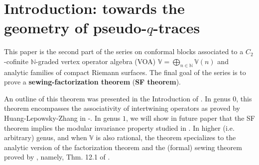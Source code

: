 \documentclass[11pt,b5paper,notitlepage]{article}
\theoremstyle{definition}
\theoremstyle{plain}
\newcommand{\Vbb}{\mathbb V}
\newcommand{\Nbb}{\mathbb N}
\newcommand{\<}{\left\langle}
\renewcommand{\>}{\right\rangle}
\numberwithin{equation}{subsection}
\begin{document}


	
	
	
	

	
	

	
	
	
	
	
	
	
	
	



\section{Introduction: towards the geometry of pseudo-$q$-traces}

\nocite{HLZ1,HLZ2,HLZ3,HLZ4,HLZ5,HLZ6,HLZ7,HLZ8}



This paper is the second part of the series on conformal blocks associated to a $C_2$-cofinite $\Nbb$-graded vertex operator algebra (VOA) $\Vbb=\bigoplus_{n\in\Nbb}\Vbb(n)$ and analytic families of compact Riemann surfaces. The final goal of the series is to prove a \textbf{sewing-factorization theorem} (\textbf{SF theorem}). 

An outline of this theorem was presented in the Introduction of \cite{GZ1}. In genus $0$, this theorem encompasses the associativity of intertwining operators as proved by Huang-Lepowsky-Zhang in \cite{HLZ1,HLZ2}-\cite{HLZ8}. In genus $1$, we will show in future paper that the SF theorem implies the modular invariance property studied in \cite{Zhu-modular-invariance,Miy-modular-invariance,AN-pseudo-trace,Hua-modular-C2}. In higher (i.e. arbitrary) genus, and when $\Vbb$ is also rational, the theorem specializes to the analytic version of the factorization theorem and the (formal) sewing theorem proved by \cite{DGT2}, namely, Thm. 12.1 of \cite{Gui-sewingconvergence}. 
\end{document}
